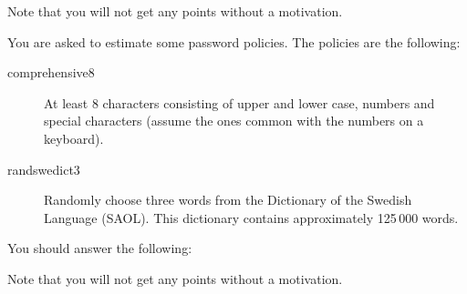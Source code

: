 \documentclass[a4paper,addpoints]{exam}
\begin{document}
\begin{questions}
  Note that you will not get any points without a motivation.


  \question\label{q:passwd:infotheory:E:C:A}
  You are asked to estimate some password policies.
  The policies are the following:
  \begin{description}
    \item[comprehensive8]
      At least 8 characters consisting of upper and lower case, numbers and 
      special characters (assume the ones common with the numbers on 
      a keyboard).
    \item[randswedict3]
      Randomly choose three words from the Dictionary of the Swedish Language 
      (SAOL).
      This dictionary contains approximately 125\,000 words.
  \end{description}
  You should answer the following:
  Note that you will not get any points without a motivation.



\end{questions}
\end{document}
